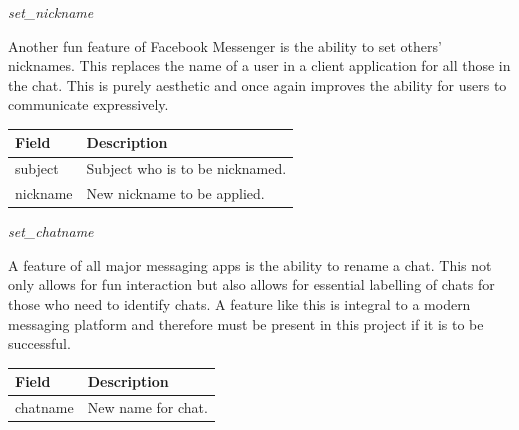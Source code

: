 \documentclass{article}
\begin{document}
\begin{center}
    \Large{\textit{set\_nickname}}
\end{center}
Another fun feature of Facebook Messenger is the ability to set others' nicknames. This replaces the name of a user in a client application for all those in the chat. This is purely aesthetic and once again improves the ability for users to communicate expressively.
\begin{table}[H]
\centering
\begin{tabular}{|p{2.5cm}|p{8.5cm}|}
\hline
\rowcolor{tblgrey} 
Field           & Description                                               \\ \hline
subject         & Subject who is to be nicknamed.                           \\ \hline
nickname        & New nickname to be applied.                               \\ \hline
\end{tabular}
\end{table}

\begin{center}
    \Large{\textit{set\_chatname}}
\end{center}
A feature of all major messaging apps is the ability to rename a chat. This not only allows for fun interaction but also allows for essential labelling of chats for those who need to identify chats. A feature like this is integral to a modern messaging platform and therefore must be present in this project if it is to be successful.
\begin{table}[H]
\centering
\begin{tabular}{|p{2.5cm}|p{8.5cm}|}
\hline
\rowcolor{tblgrey} 
Field           & Description                                               \\ \hline
chatname        & New name for chat.                                        \\ \hline
\end{tabular}
\end{table}
\end{document}
